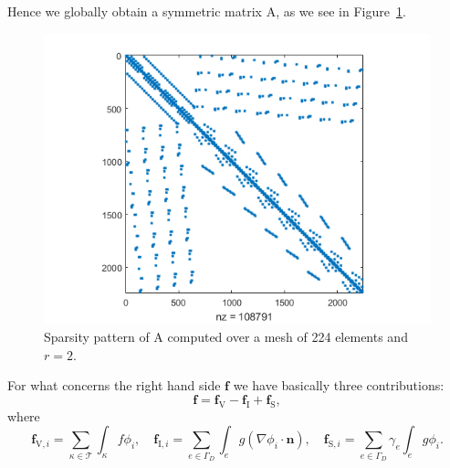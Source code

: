 \documentclass[12pt, a4paper]{article}
\theoremstyle{definition}
\theoremstyle{plain}
\theoremstyle{plain}
\begin{document}
Hence we globally obtain a symmetric matrix $\mathrm{A}$, as we see in Figure~\ref{fig:spy}.
\begin{figure}[h] 
	\centering
	\includegraphics[scale=0.8]{spy_A}
	\caption{Sparsity pattern of $\mathrm{A}$ computed over a mesh of 224 elements and $r=2$.}
	\label{fig:spy}
\end{figure}
\newline
For what concerns the right hand side $\mathbf{f}$ we have basically three contributions:
\begin{equation*}
\mathbf{f} = \mathbf{f}_\mathrm{V} - \mathbf{f}_\mathrm{I} + \mathbf{f}_\mathrm{S},
\end{equation*}
where
\begin{equation*}
	\mathbf{f}_{\mathrm{V}, i} = \sum_{\kappa \in \mathcal{T}} \int_\kappa f \phi_i, \quad
	\mathbf{f}_{\mathrm{I}, i} = \sum_{e \in \Gamma_D} \int_e g (\nabla \phi_i \cdot \mathbf{n}), \quad
	\mathbf{f}_{\mathrm{S}, i} = \sum_{e \in \Gamma_D} \gamma_e \int_e g \phi_i.
\end{equation*}
\end{document}
